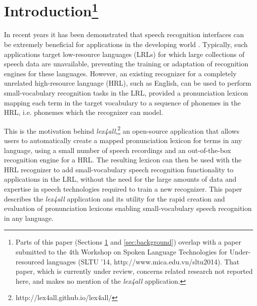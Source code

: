\documentclass[11pt]{article}
\begin{document}
\section{Introduction\footnote{Parts of this paper (Sections \ref{sec:intro} and \ref{sec:background}) overlap with a paper submitted to the 4th Workshop on Spoken Language Technologies for Under-resourced languages (SLTU '14, http://www.mica.edu.vn/sltu2014). That paper, which is currently under review, concerns related research not reported here, and makes no mention of the \textit{lex4all} application.}}
\label{sec:intro}

In recent years it has been demonstrated that speech recognition interfaces can be extremely beneficial for applications in the developing world
 \cite{case4st4d,Sherwani09,bali13}. 
Typically, 
such applications target low-resource languages (LRLs) for which large collections of speech data are unavailable, preventing the training or adaptation of recognition engines for these languages.
However, 
an existing recognizer for a completely unrelated high-resource language (HRL), such as English, can be used to perform small-vocabulary recognition tasks in the LRL,
provided a pronunciation lexicon mapping each term in the target vocabulary to a sequence of phonemes in the HRL, i.e. phonemes which the recognizer can model. 

This is the motivation behind \textit{lex4all},\footnote{http://lex4all.github.io/lex4all/} an open-source application that allows users to automatically create a mapped pronunciation lexicon for terms in any language, using a small number of speech recordings and an out-of-the-box recognition engine for a HRL. The resulting lexicon can then be used with the HRL recognizer to add small-vocabulary speech recognition functionality to applications in the LRL, without the need for the large amounts of data and expertise in speech technologies required to train a new recognizer. This paper describes the \textit{lex4all} application and its utility for the rapid
creation and evaluation of pronunciation lexicons enabling small-vocabulary speech recognition in any language.
\end{document}
